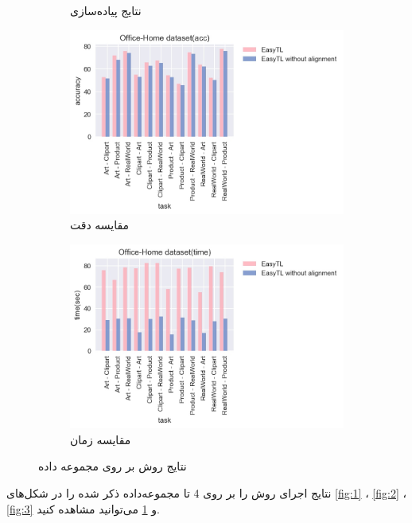 \begin{figure}[H]
\begin{subfigure}[b]{0.2\textwidth}
		\caption{نتایج پیاده‌سازی}
	\end{subfigure}%
	\begin{subfigure}[b]{0.3\textwidth}
		\centering
		\includegraphics[width=\linewidth]{images/4_2.jpg}
		\caption{مقایسه دقت}
	\end{subfigure}%
	\begin{subfigure}[b]{0.3\textwidth}
		\centering
		\includegraphics[width=\linewidth]{images/4_3.jpg}
		\caption{مقایسه زمان}
	\end{subfigure}%
	\caption{
		نتایج روش
		بر روی مجموعه داده
		\textit{}
	}
	\label{fig:4}
\end{figure}
\newpage
نتایج اجرای روش
را بر روی 4 تا مجموعه‌داده ذکر شده را در شکل‌های
\ref{fig:1}
،
\ref{fig:2}
،
\ref{fig:3}
و
\ref{fig:4}
می‌توانید مشاهده کنید. 

